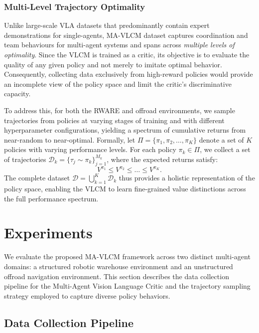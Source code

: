 \documentclass[letterpaper, 10 pt, conference]{ieeeconf}  %
\begin{document}
\subsubsection{Multi-Level Trajectory Optimality}
\label{subsec:trajectory_optimality}
Unlike large-scale VLA datasets that predominantly contain expert demonstrations for single-agents, MA-VLCM dataset captures coordination and  team behaviours for multi-agent systems and spans across \textit{multiple levels of optimality}. Since the VLCM is trained as a critic, its objective is to evaluate the quality of any given policy and not merely to imitate optimal behavior. Consequently, collecting data exclusively from high-reward policies would provide an incomplete view of the policy space and limit the critic's discriminative capacity.

To address this, for both the RWARE and offroad environments, we sample trajectories from policies at varying stages of training and with different hyperparameter configurations, yielding a spectrum of cumulative returns from near-random to near-optimal. Formally, let $\Pi = \{\pi_1, \pi_2, \dots, \pi_K\}$ denote a set of $K$ policies with varying performance levels. For each policy $\pi_k \in \Pi$, we collect a set of trajectories $\mathcal{D}_k = \{\tau_j \sim \pi_k\}_{j=1}^{M_k}$, where the expected returns satisfy:
\begin{equation}
    V^{\pi_1} \leq V^{\pi_2} \leq \dots \leq V^{\pi_K}.
\end{equation}
The complete dataset $\mathcal{D} = \bigcup_{k=1}^{K} \mathcal{D}_k$ thus provides a holistic representation of the policy space, enabling the VLCM to learn fine-grained value distinctions across the full performance spectrum.



\section{Experiments}
We evaluate the proposed MA-VLCM framework across two distinct multi-agent domains: a structured robotic warehouse environment and an unstructured offroad navigation environment. This section describes the data collection pipeline for the Multi-Agent Vision Language Critic and the trajectory sampling strategy employed to capture diverse policy behaviors.

\subsection{Data Collection Pipeline}
\label{subsec:data_collection}
\end{document}
